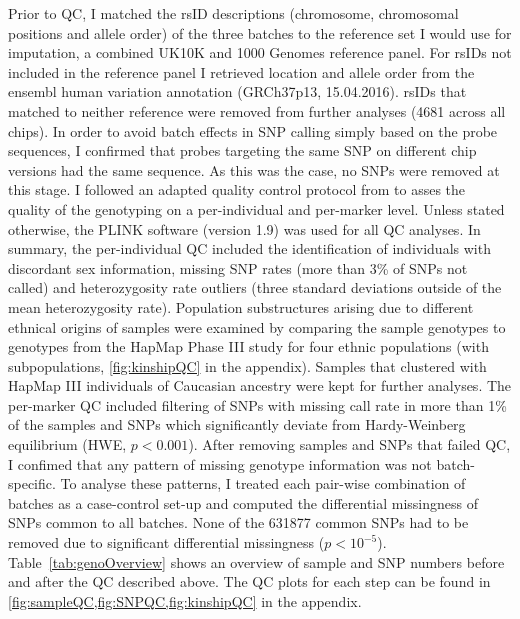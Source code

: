 Prior to QC, I matched the rsID descriptions (chromosome, chromosomal positions and allele order) of the three batches to the reference set I would use for imputation, a combined UK10K \citep{UK10KConsortium2015} and \num{1000} Genomes \citep{1000Genomes2015} reference panel. For rsIDs not included in the reference panel I retrieved location and allele order from the ensembl human variation annotation (GRCh37p13, 15.04.2016). rsIDs that matched to neither reference were removed from further analyses (\num{4681} across all chips). In order to avoid batch effects in SNP calling simply based on the probe sequences, I confirmed that probes targeting the same SNP on different chip versions had the same sequence. As this was the case, no SNPs were removed at this stage. 
I followed an adapted quality control protocol from \citet{Anderson2010} to asses the quality of the genotyping on a per-individual and per-marker level. Unless stated otherwise, the PLINK software (version 1.9) \citep{Purcell2007, Chang2015} was used for all QC analyses. In summary, the per-individual QC included the identification of individuals with discordant sex information, missing SNP rates (more than 3\% of SNPs not called) and heterozygosity rate outliers (three standard deviations outside of the mean heterozygosity rate). Population substructures arising due to different ethnical origins of samples were examined by comparing the sample genotypes to genotypes from the HapMap Phase III study \citep{HapMap2005} for four ethnic populations (with subpopulations, \cref{fig:kinshipQC} in the appendix). Samples that clustered with HapMap III individuals of Caucasian ancestry were kept for further analyses. The per-marker QC included filtering of SNPs with missing call rate in more than \num{1}\% of the samples and SNPs which significantly deviate from Hardy-Weinberg equilibrium (HWE, \(p < 0.001\)). After removing samples and SNPs that failed QC, I confimed that any pattern of missing genotype information was not batch-specific. To analyse these patterns, I treated each pair-wise combination of batches as a case-control set-up and computed the differential missingness of SNPs common to all batches. None of the \num{631877} common SNPs had to be removed due to significant differential missingness (\(p < 10^{-5}\)). Table~\ref{tab:genoOverview} shows an overview of sample and SNP numbers before and after the QC described above. The QC plots for each step can be found in \cref{fig:sampleQC,fig:SNPQC,fig:kinshipQC} in the appendix. 
\\
